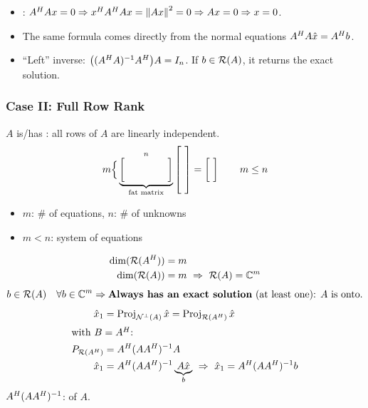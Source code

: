 \begin{insight}
\begin{itemize}[nosep,leftmargin=1.2em]
\item {}: $A^{H} Ax=0\Rightarrow x^{H} A^{H} Ax=\left\lVert Ax \right\rVert^2=0\Rightarrow Ax=0\Rightarrow x=0$.
\item The same formula comes directly from the normal equations $A^{H} A\hat x=A^{H} b$.
\item ``Left'' inverse: $\big((A^{H} A)^{-1}A^{H}\big)A=I_n$. If $b\in\mathcal{R}(A)$, it returns the exact solution.
\end{itemize}
\end{insight}

\subsubsection{Case II: Full Row Rank}
$A$ is/has : all rows of $A$ are linearly independent.
\[
m\Big\{\underbrace{\overset{n}{\begin{bmatrix}\ &\ &\ &\ \\ \ &\ &\ &\ \end{bmatrix}}}_{\text{fat matrix}}
\begin{bmatrix}\ \\ \ \\ \ \\ \ \end{bmatrix}=\begin{bmatrix}\ \\ \ \end{bmatrix} \qquad m\leq n
\]
\begin{itemize}[nosep,leftmargin=1.5em]
\item $m$: \# of equations, \quad $n$: \# of unknowns
\item $m<n$:  system of equations
\end{itemize}
\begin{align*}
\dim(\mathcal{R}(A^{H}))&=m\\
\dim(\mathcal{R}(A))&=m \ \Rightarrow\ \mathcal{R}(A)=\mathbb{C}^m
\end{align*}
\[
b\in\mathcal{R}(A)\quad\forall b\in\mathbb{C}^m\Rightarrow\text{\textbf{Always has an exact solution} (at least one): $A$ is onto.}
\]
\begin{align*}
\hat{x}_1&=\operatorname{Proj}_{\mathcal{N}^\perp(A)}\hat{x}=\operatorname{Proj}_{\mathcal{R}(A^{H})}\hat{x}\\
\intertext{with $B=A^{H}$:}
P_{\mathcal{R}(A^{H})}&=A^{H}(AA^{H})^{-1}A\\
\hat{x}_1&=A^{H}(AA^{H})^{-1}\underbrace{A\hat{x}}_{b}\ \Rightarrow\ \hat{x}_1=A^{H}(AA^{H})^{-1}b
\end{align*}
$A^{H}(AA^{H})^{-1}$:  of $A$.

